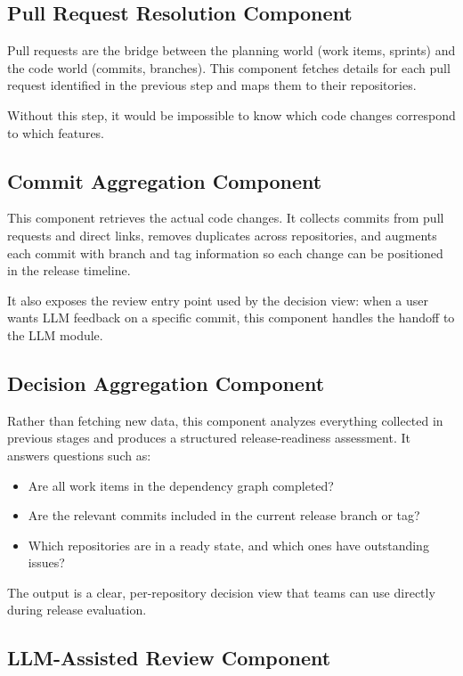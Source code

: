 \subsection{Pull Request Resolution Component}

Pull requests are the bridge between the planning world (work items, sprints) and the code world (commits, branches). This component fetches details for each pull request identified in the previous step and maps them to their repositories.

Without this step, it would be impossible to know which code changes correspond to which features.

\subsection{Commit Aggregation Component}

This component retrieves the actual code changes. It collects commits from pull requests and direct links, removes duplicates across repositories, and augments each commit with branch and tag information so each change can be positioned in the release timeline.

It also exposes the review entry point used by the decision view: when a user wants LLM feedback on a specific commit, this component handles the handoff to the LLM module.

\subsection{Decision Aggregation Component}

Rather than fetching new data, this component analyzes everything collected in previous stages and produces a structured release-readiness assessment. It answers questions such as:

\begin{itemize}
    \item Are all work items in the dependency graph completed?
    \item Are the relevant commits included in the current release branch or tag?
    \item Which repositories are in a ready state, and which ones have outstanding issues?
\end{itemize}

The output is a clear, per-repository decision view that teams can use directly during release evaluation.

\subsection{LLM-Assisted Review Component}

